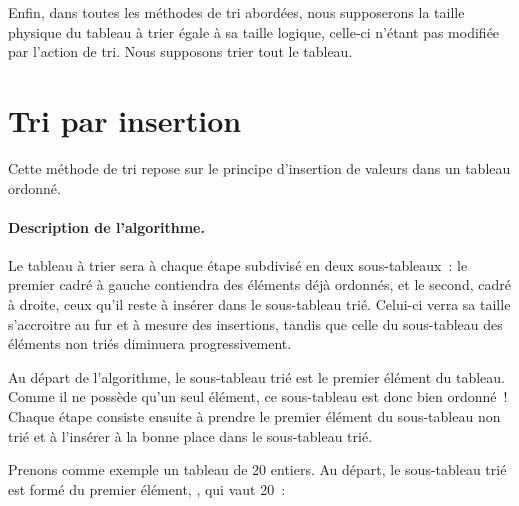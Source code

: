 	Enfin, dans toutes les méthodes de tri abordées, nous supposerons la taille
	physique du tableau à trier égale à sa taille logique, celle-ci n’étant pas
	modifiée par l’action de tri. Nous supposons trier tout le tableau. 



\clearpage
\section{Tri par insertion}

	Cette méthode de tri repose sur le principe d’insertion de valeurs dans
	un tableau ordonné. 

	\paragraph{Description de l’algorithme.}
	
	Le tableau à trier sera à chaque étape subdivisé en deux sous-tableaux~:
	le premier cadré à gauche contiendra des éléments déjà ordonnés, et le
	second, cadré à droite, ceux qu’il reste à insérer dans le sous-tableau
	trié. Celui-ci verra sa taille s’accroitre au fur et à mesure des
	insertions, tandis que celle du sous-tableau des éléments non triés
	diminuera progressivement.

	Au départ de l’algorithme, le sous-tableau trié est le premier élément
	du tableau. Comme il ne possède qu’un seul élément, ce sous-tableau est
	donc bien ordonné~! Chaque étape consiste ensuite à prendre le premier
	élément du sous-tableau non trié et à l’insérer à la bonne place dans
	le sous-tableau trié.

	Prenons comme exemple un tableau  de 20 entiers. 	
	Au départ, le sous-tableau trié est formé du premier élément, 
	, qui vaut 20~:

